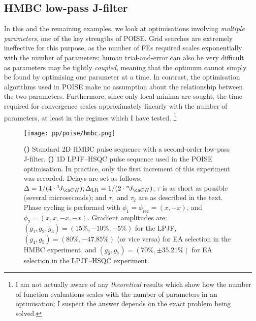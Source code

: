 \subsection{HMBC low-pass J-filter}
\label{subsec:poise__hmbc}

In this and the remaining examples, we look at optimisations involving \textit{multiple parameters}, one of the key strengths of POISE.
Grid searches are extremely ineffective for this purpose, as the number of FEs required scales exponentially with the number of parameters; human trial-and-error can also be very difficult as parameters may be tightly \textit{coupled}, meaning that the optimum cannot simply be found by optimising one parameter at a time.
In contrast, the optimisation algorithms used in POISE make no assumption about the relationship between the two parameters.
Furthermore, since only local minima are sought, the time required for convergence scales approximately linearly with the number of parameters, at least in the regimes which I have tested.%
\footnote{I am not actually aware of any \textit{theoretical} results which show how the number of function evaluations scales with the number of parameters in an optimisation; I suspect the answer depends on the exact problem being solved.}

\begin{figure}[htb]
    \centering
    \texttt{[image: pp/poise/hmbc.png]}%
    {\label{fig:poise_hmbc_pulseq_hmbc}}%
    {\label{fig:poise_hmbc_pulseq_hsqc}}%
    \caption[Pulse sequences used for HMBC optimisation]{
        \textbf{()} Standard 2D HMBC pulse sequence with a second-order low-pass J-filter.
        \textbf{()} 1D LPJF--HSQC pulse sequence used in the POISE optimisation.
        In practice, only the first increment of this experiment was recorded.
        Delays are set as follows: $\Delta = 1 / (4 \cdot \oneJ{CH}); \Delta_\text{LR} = 1 / (2 \cdot \nJ{CH})$; $\tau$ is as short as possible (several microseconds); and $\tau_1$ and $\tau_2$ are as described in the text.
        Phase cycling is performed with $\phi_1 = \phi_\text{rec} = (x, -x)$, and $\phi_2 = (x, x, -x, -x)$.
        Gradient amplitudes are: $(g_1, g_2, g_3) = (15\%, -10\%, -5\%)$ for the LPJF, $(g_4, g_5) = (80\%, -47.85\%)$ (or vice versa) for EA selection in the HMBC experiment\autocite{Cicero2001JMR}, and $(g_6, g_7) = (70\%, \pm 35.21\%)$ for EA selection in the LPJF--HSQC experiment.
    }
    \label{fig:poise_hmbc_pulseq}
\end{figure}


